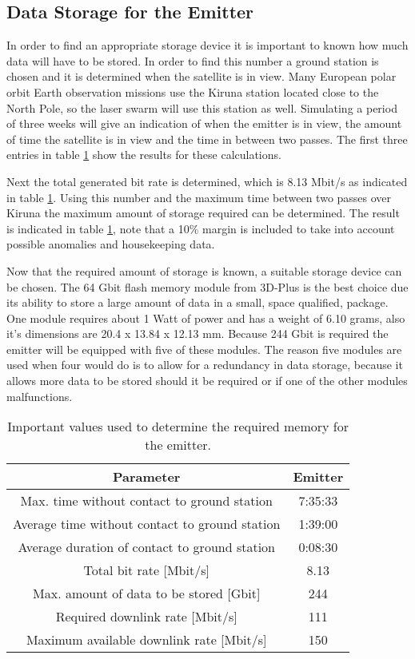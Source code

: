 \subsection{Data Storage for the Emitter}
\label{DSEmitter}

In order to find an appropriate storage device it is important to known how much data will have to be stored. In order to find this number a ground station is chosen and it is determined when the satellite is in view. Many European polar orbit Earth observation missions use the Kiruna station located close to the North Pole, so the laser swarm will use this station as well. Simulating a period of three weeks will give an indication of when the emitter is in view, the amount of time the satellite is in view and the time in between two passes. The first three entries in table \ref{DSEmitterTable} show the results for these calculations.

Next the total generated bit rate is determined, which is 8.13 Mbit/s as indicated in table \ref{DSEmitterTable}. Using this number and the maximum time between two passes over Kiruna the maximum amount of storage required can be determined. The result is indicated in table \ref{DSEmitterTable}, note that a 10\% margin is included to take into account possible anomalies and housekeeping data. 

Now that the required amount of storage is known, a suitable storage device can be chosen. The 64 Gbit flash memory module from 3D-Plus \cite{DataStorage} is the best choice due its ability to store a large amount of data in a small, space qualified, package. One module requires about 1 Watt of power and has a weight of 6.10 grams, also it's dimensions are 20.4 x 13.84 x 12.13 mm. Because 244 Gbit is required the emitter will be equipped with five of these modules. The reason five modules are used when four would do is to allow for a redundancy in data storage, because it allows more data to be stored should it be required or if one of the other modules malfunctions.

\begin{table}
\centering
\begin{tabular}{c|c}
\hline
\textbf{Parameter}  & \textbf{Emitter} \\\hline\hline
	Max. time without contact to ground station & 7:35:33 \\
	Average time without contact to ground station & 1:39:00  \\
	Average duration of contact to ground station & 0:08:30 \\
	Total bit rate [Mbit/s] & 8.13 \\
	Max. amount of data to be stored [Gbit] & 244 \\
	Required downlink rate [Mbit/s] & 111 \\
	Maximum available downlink rate [Mbit/s] & 150 \\\hline
\end{tabular}
\caption{Important values used to determine the required memory for the emitter.}
\label{DSEmitterTable}
\end{table}

